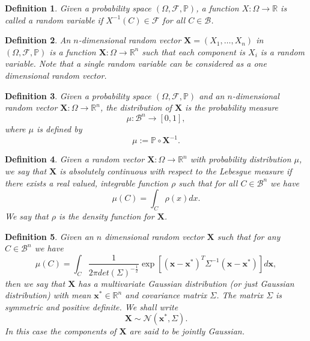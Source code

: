 \documentclass[12pt]{book}
\newtheorem{definition}{Definition}
\newcommand{\p}{\mathbb{P}}
\begin{document}
\begin{definition}
Given a probability space $(\Omega,\mathscr{F},\p)$, a function $X:\Omega\rightarrow\mathbb{R}$ is called 
a random variable
if $X^{-1}(C)\in\mathscr{F}$ for all $C\in\mathcal{B}$.
\end{definition}

\begin{definition}
 An $n$-dimensional random vector $\textbf{X}=(X_{1},\ldots,X_{n})$ in $(\Omega,\mathscr{F},\p)$ 
is a function $\textbf{X}:\Omega\rightarrow\mathbb{R}^{n}$ such that each component is $X_{i}$ is a random variable. 
Note that a single random variable can be considered as a one dimensional random vector.
\end{definition}

\begin{definition}
Given a probability space $(\Omega,\mathscr{F},\p)$ and an $n$-dimensional  random vector 
$\mathbf{X}:\Omega\rightarrow\mathbb{R}^{n}$, the distribution of $\mathbf{X}$
is the probability measure
\begin{equation*}
\mu:\mathcal{B}^{n}\rightarrow [0,1],
\end{equation*}
where  $\mu$ is defined by 
\begin{equation*}
\mu:=\p\circ \textbf{X}^{-1}.
\end{equation*}
\end{definition}
\begin{definition}
Given a random vector $\textbf{X}:\Omega\rightarrow\mathbb{R}^{n}$ with
probability distribution $\mu$, we say that $\mathbf{X}$ is absolutely 
continuous with respect to the Lebesgue measure if there exists a real valued, integrable function $\rho$
such that for all $C\in\mathcal{B}^{n}$ we have
\begin{equation*}
\mu(C)=\int_{C}\rho(x)dx.
\end{equation*}
We say that $\rho$ is the density function for $\mathbf{X}$.
\end{definition}
\begin{definition}\label{dfnrandonvariables}
Given an $n$ dimensional random vector $\mathbf{X}$ such that for any 
$C\in\mathcal{B}^{n}$ we have
\begin{equation}\label{eqnmultivariateGaussianDefinition}
\mu(C)=\int_{C}
\frac{1}{2\pi det(\Sigma)^{-\frac{1}{2}}}\exp\left[(\textbf{x}-\textbf{x}^{*})^{T}\Sigma^{-1}
(\textbf{x}-\textbf{x}^{*})\right]d\textbf{x},
\end{equation}
then we say
that $\textbf{X}$ has a multivariate Gaussian distribution (or just Gaussian distribution) 
with mean $\textbf{x}^{*}\in\mathbb{R}^{n}$
and covariance matrix $\Sigma$. The matrix $\Sigma$ is symmetric and positive definite. We shall write
\begin{equation}\label{eqnMultivariate}
\textbf{X}\sim \mathcal{N}(\textbf{x}^{*},\Sigma).
\end{equation}
In this case the components of $\textbf{X}$ are said to be \textit{jointly Gaussian}.
\end{definition}
\end{document}
